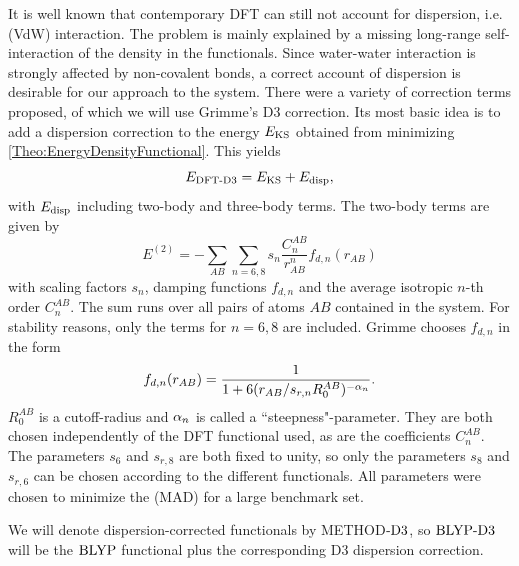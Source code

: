 It is well known that contemporary DFT can still not account for dispersion,
i.e.  (VdW) interaction. 
The problem is mainly explained by a missing long-range self-interaction
of the density in the functionals.\cite{Kryachko2012} 
Since water-water interaction is strongly affected by non-covalent bonds, a correct
account of dispersion is desirable for our approach to the system. 
There were a
variety of correction terms proposed, \cite{BeckeXDM2007,GrimmeDCorrection2010}
of which we will use Grimme's D3 correction. \cite{GrimmeD32011} Its most basic
idea is to add a dispersion correction to the energy $E_{\text{KS}}$ obtained
from minimizing \eqref{Theo:EnergyDensityFunctional}.
This yields
\begin{equation}
E_{\text{DFT-D3}}=E_{\text{KS}}+E_{\text{disp}},
\end{equation}  
with $E_{\text{disp}}$ including two-body and three-body terms. The two-body terms
are given by
\begin{equation}
E^{(2)}=-\sum_{AB}\sum_{n=6,8} s_n \frac {C_n^{AB}}{r_{AB}^n} f_{d,n}(r_{AB})
\end{equation}
with scaling factors $s_n$, damping functions $f_{d,n}$ and the average isotropic
$n$-th order  $C_n^{AB}$. The sum runs over
all pairs of atoms $AB$ contained in the system. For stability reasons, only the terms
for $n=6,8$ are included. 
Grimme chooses $f_{d,n}$ in the form
\begin{equation}
f_{d,n}(r_{AB})=\frac 1 {1+6(r_{AB}/s_{r,n}R_0^{AB})^{-\alpha_n}}.
\end{equation}
$R_0^{AB}$ is a cutoff-radius and $\alpha_n$ is called a ``steepness"-parameter. They are both
chosen independently of the DFT functional used, as are the coefficients
$C_n^{AB}$. The parameters $s_6$ and $s_{r,8}$ are both fixed to unity, so only the parameters
$s_8$ and $s_{r,6}$ can be chosen according to the different functionals. All
parameters were chosen to minimize the  (MAD) for
a large benchmark set.\cite{GrimmeD32011}

We will denote dispersion-corrected functionals by METHOD$\text{-D3}$, so $\text{BLYP}\text{-D3}$
will be the $\text{BLYP}$ functional plus the corresponding D3 dispersion correction.


